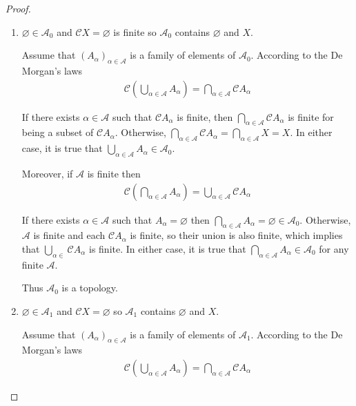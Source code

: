 \begin{proof}
	\begin{enumerate}[label={(\alph*)},leftmargin=*]
		\item \( \varnothing \in \mathscr{A}_{0} \) and \( \mathscr{C}X = \varnothing \) is finite so \( \mathscr{A}_{0} \) contains \( \varnothing \) and \( X \).

		      Assume that \( {(A_{\alpha})}_{\alpha\in\mathscr{A}} \) is a family of elements of \( \mathscr{A}_{0} \). According to the De Morgan's laws
		      \begin{align*}
			      \mathscr{C}\left( \bigcup_{\alpha\in\mathscr{A}} A_{\alpha} \right) = \bigcap_{\alpha\in\mathscr{A}} \mathscr{C}A_{\alpha}
		      \end{align*}

		      If there exists \( \alpha \in \mathscr{A} \) such that \( \mathscr{C}A_{\alpha} \) is finite, then \( \bigcap_{\alpha\in\mathscr{A}} \mathscr{C}A_{\alpha} \) is finite for being a subset of \( \mathscr{C}A_{\alpha} \). Otherwise, \( \bigcap_{\alpha\in\mathscr{A}} \mathscr{C}A_{\alpha} = \bigcap_{\alpha\in\mathscr{A}} X = X \). In either case, it is true that \( \bigcup_{\alpha\in\mathscr{A}} A_{\alpha} \in \mathscr{A}_{0} \).

		      Moreover, if \( \mathscr{A} \) is finite then
		      \begin{align*}
			      \mathscr{C}\left( \bigcap_{\alpha\in\mathscr{A}} A_{\alpha} \right) = \bigcup_{\alpha\in\mathscr{A}} \mathscr{C}A_{\alpha}
		      \end{align*}

		      If there exists \( \alpha \in \mathscr{A} \) such that \( A_{\alpha} = \varnothing \) then \( \bigcap_{\alpha\in\mathscr{A}} A_{\alpha} = \varnothing \in \mathscr{A}_{0} \). Otherwise, \( \mathscr{A} \) is finite and each \( \mathscr{C}A_{\alpha} \) is finite, so their union is also finite, which implies that \( \bigcup_{\alpha\in}\mathscr{C}A_{\alpha} \) is finite. In either case, it is true that \( \bigcap_{\alpha\in\mathscr{A}} A_{\alpha} \in \mathscr{A}_{0} \) for any finite \( \mathscr{A} \).

		      Thus \( \mathscr{A}_{0} \) is a topology.
		\item \( \varnothing \in \mathscr{A}_{1} \) and \( \mathscr{C}X = \varnothing \) so \( \mathscr{A}_{1} \) contains \( \varnothing \) and \( X \).

		      Assume that \( {(A_{\alpha})}_{\alpha\in\mathscr{A}} \) is a family of elements of \( \mathscr{A}_{1} \). According to the De Morgan's laws
		      \begin{align*}
			      \mathscr{C}\left( \bigcup_{\alpha\in\mathscr{A}} A_{\alpha} \right) = \bigcap_{\alpha\in\mathscr{A}} \mathscr{C}A_{\alpha}
		      \end{align*}


\end{enumerate}
\end{proof}
